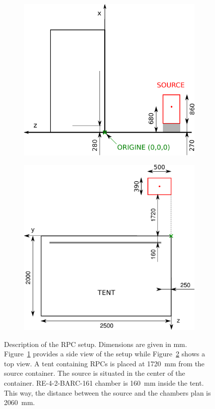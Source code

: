 				\begin{figure}[!h]
			\begin{subfigure}{0.5\linewidth}
				\includegraphics[width = 0.5\plotwidth]{fig/position-side.pdf}
				\caption{\label{fig:GIFSetup:A}}
			\end{subfigure}
			\begin{subfigure}{0.5\linewidth}
				\includegraphics[width = 0.5\plotwidth]{fig/position-top.pdf}
				\caption{\label{fig:GIFSetup:B}}
			\end{subfigure}
			\caption{\label{fig:GIFSetup} Description of the RPC setup. Dimensions are given in \si{\mm}. Figure~\ref{fig:GIFSetup:A} provides a side view of the setup while Figure~\ref{fig:GIFSetup:B} shows a top view. A tent containing RPCs is placed at \SI{1720}{\mm} from the source container. The source is situated in the center of the container. RE-4-2-BARC-161 chamber is \SI{160}{\mm} inside the tent. This way, the distance between the source and the chambers plan is \SI{2060}{\mm}.}
		\end{figure}

